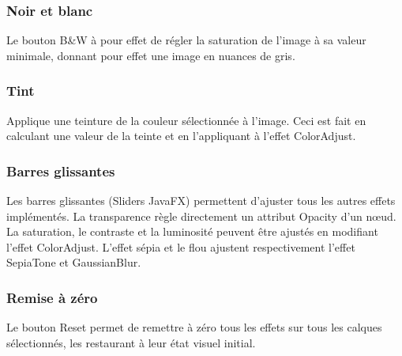 \subsubsection{Noir et blanc}
Le bouton \og B\&W \fg{} à pour effet de régler la saturation de l'image à sa valeur minimale, donnant pour effet une image en nuances de gris.

\subsubsection{Tint}
Applique une teinture de la couleur sélectionnée à l'image. Ceci est fait en calculant une valeur de la teinte et en l'appliquant à l'effet ColorAdjust.

\subsubsection{Barres glissantes}
Les barres glissantes (\og Sliders \fg{} JavaFX) permettent d'ajuster tous les autres effets implémentés. La transparence règle directement un attribut \og Opacity \fg{} d'un n\oe ud. La saturation, le contraste et la luminosité peuvent être ajustés en modifiant l'effet ColorAdjust. L'effet sépia et le flou ajustent respectivement l'effet SepiaTone et GaussianBlur.

\subsubsection{Remise à zéro}
Le bouton \og Reset \fg{} permet de remettre à zéro tous les effets sur tous les calques sélectionnés, les restaurant à leur état visuel initial.
